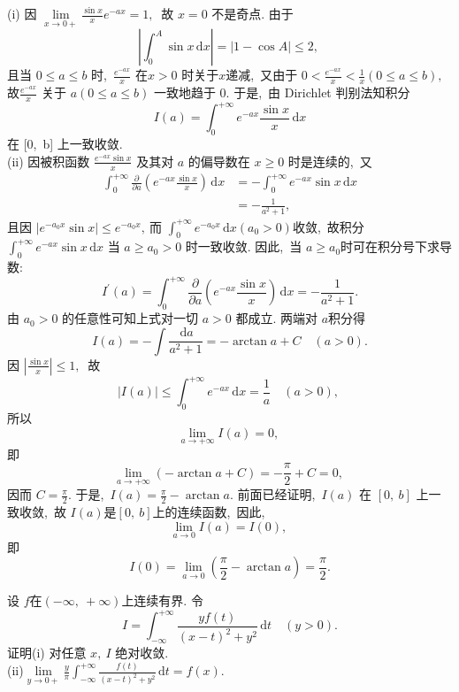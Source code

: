 	\begin{solution}
		(i) 因 $ \lim\limits_{x \rightarrow 0+} \frac{\sin x}{x} e^{-a x}=1 ,\ $ 故 $ x=0 $ 不是奇点. 由于
		$$\left|\int_{0}^{A} \sin x \,\text{d} x\right|=|1-\cos A| \leqslant 2,\ $$
		且当 $ 0 \leqslant a \leqslant b $ 时,\   $\frac{e^{-a x}}{x}$  在$  x>0$  时关于$  x  $递减,\  又由于 $ 0<\frac{e^{-a x}}{x}<\frac{1}{x}(0 \leqslant a \leqslant b) ,\ $ 故$  \frac{e^{-a x}}{x} $ 关于 $ a(0 \leqslant a \leqslant b)$  一致地趋于 $0 .$ 于是,\  由 Dirichlet 判别法知积分
		$$I(a)=\int_{0}^{+\infty} e^{-a x} \frac{\sin x}{x} \,\text{d} x$$
		在  [0,\  b]  上一致收敛.\\
		(ii) 因被积函数  $\frac{e^{-a x} \sin x}{x} $ 及其对  $a$  的偏导数在  $x \geqslant 0$  时是连续的,\  又
		$$\begin{aligned}
			\int_{0}^{+\infty} \frac{\partial}{\partial a}\left(e^{-a x} \frac{\sin x}{x}\right) \,\text{d} x &=-\int_{0}^{+\infty} e^{-a x} \sin x \,\text{d} x \\
			&=-\frac{1}{a^{2}+1},\ 
		\end{aligned}$$
		且因  $\left|e^{-a_{0} x} \sin x\right| \leqslant e^{-a_{0} x} ,\  $而 $ \int_{0}^{+\infty} e^{-a_{0} x} \,\text{d} x\left(a_{0}>0\right)  $收敛,\  故积分 $ \int_{0}^{+\infty} e^{-a x} \sin x \,\text{d} x $ 当 $ a \geqslant a_{0}>0 $ 时一致收敛. 因此,\  当 $ a \geqslant a_{0}  $时可在积分号下求导数:
		$$I^{\prime}(a)=\int_{0}^{+\infty} \frac{\partial}{\partial a}\left(e^{-a x} \frac{\sin x}{x}\right) \,\text{d} x=-\frac{1}{a^{2}+1} .$$
		由 $ a_{0}>0 $ 的任意性可知上式对一切 $ a>0 $ 都成立. 两端对 $ a  $积分得
		$$I(a)=-\int \frac{\,\text{d} a}{a^{2}+1}=-\arctan a+C \quad(a>0) .$$
		因 $ \left|\frac{\sin x}{x}\right| \leqslant 1 ,\ $ 故
		$$|I(a)| \leqslant \int_{0}^{+\infty} e^{-a x} \,\text{d} x=\frac{1}{a} \quad(a>0),\ $$
		所以
		$$\lim_{a \rightarrow+\infty}I(a)=0,\ $$
		即
		$$\lim\limits_{a \rightarrow+\infty}(-\arctan a+C)=-\frac{\pi}{2}+C=0,\ $$
		因而 $ C=\frac{\pi}{2} .$ 于是,\   $I(a)=\frac{\pi}{2}-\arctan a .$
		前面已经证明,\  $ I(a) $ 在  $[0,\  b] $ 上一致收敛,\  故 $ I(a)  $是$  [0,\  b]  $上的连续函数,\  因此,\ 
		$$\lim\limits_{a \rightarrow 0} I(a)=I(0),\ $$
		即
		$$I(0)=\lim\limits_{a\rightarrow 0}\left(\frac{\pi}{2}-\arctan a\right)=\frac{\pi}{2}.$$ 
	\end{solution} 
	\newpage
	\begin{problem}
		设 $f  $在$(-\infty,\ +\infty)  $上连续有界. 令
		$$I=\int_{-\infty}^{+\infty} \frac{y f(t)}{(x-t)^{2}+y^{2}} \,\text{d} t \quad(y>0) .$$
		证明(i) 对任意  $x,\  I$  绝对收敛.\\
		(ii)$  \lim\limits _{y \rightarrow 0+} \frac{y}{\pi} \int_{-\infty}^{+\infty} \frac{f(t)}{(x-t)^{2} + y^{2}} \,\text{d} t=f(x) .$
	\end{problem}
	
